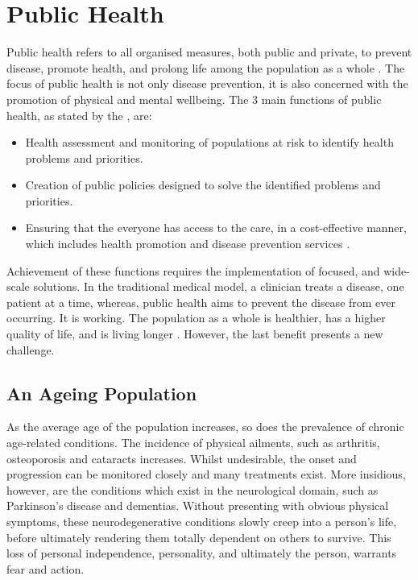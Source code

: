  \label{chapter: introduction}

\section{Public Health}
Public health refers to all organised measures, both public and private, to prevent disease, promote health, and prolong life among the population as a whole \cite{WorldHealthOrganisation2016}.
The focus of public health is not only disease prevention, it is also concerned with the promotion of physical and mental wellbeing. The 3 main functions of public health, as stated by the \citeauthor{WorldHealthOrganisation2016}, are:

\begin{itemize}
	\item Health assessment and monitoring of populations at risk to identify health problems and priorities.
	\item Creation of public policies designed to solve the identified problems and priorities.
	\item Ensuring that the everyone has access to the care, in a cost-effective manner, which includes health promotion and disease prevention services \cite{WorldHealthOrganisation2016}.
\end{itemize}

Achievement of these functions requires the implementation of focused, and wide-scale solutions. In the traditional medical model, a clinician treats a disease, one patient at a time, whereas, public health aims to prevent the disease from ever occurring. It is working. The population as a whole is healthier, has a higher quality of life, and is living longer \cite{Uhlenberg2009}. However, the last benefit presents a new challenge.

\subsection{An Ageing Population}
As the average age of the population increases, so does the prevalence of chronic age-related conditions. The incidence of physical ailments, such as arthritis, osteoporosis and cataracts increases. Whilst undesirable, the onset and progression can be monitored closely and many treatments exist. More insidious, however, are the conditions which exist in the neurological domain, such as Parkinson's disease and dementias. Without presenting with obvious physical symptoms, these neurodegenerative conditions slowly creep into a person's life, before ultimately rendering them totally dependent on others to survive. This loss of personal independence, personality, and ultimately the person, warrants fear and action.

